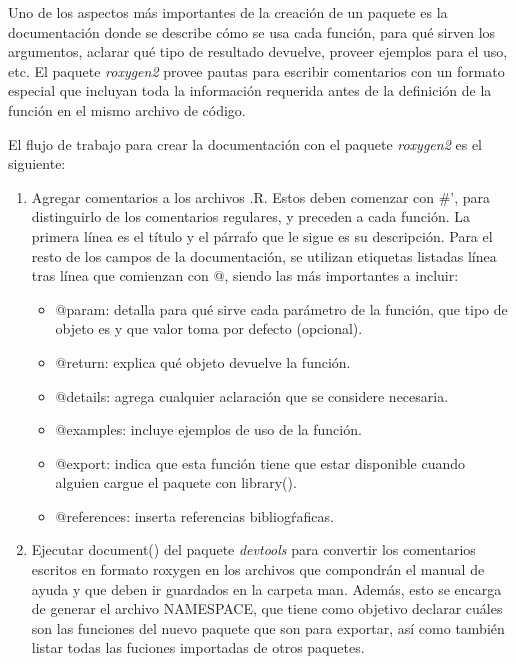 Uno de los aspectos más importantes de la creación de un paquete es la documentación donde se describe cómo se usa cada función, para qué sirven los argumentos, aclarar qué tipo de resultado devuelve, proveer ejemplos para el uso, etc. El paquete \emph{roxygen2} provee pautas para escribir comentarios con un formato especial que incluyan toda la información requerida antes de la definición de la función en el mismo archivo de código. 

El flujo de trabajo para crear la documentación con el paquete \emph{roxygen2} es el siguiente:

\begin{enumerate}

\item Agregar comentarios a los archivos .R. Estos deben comenzar con \#', para distinguirlo de los comentarios regulares, y preceden a cada función. La primera línea es el título y el párrafo que le sigue es su descripción. Para el resto de los campos de la documentación, se utilizan etiquetas listadas línea tras línea que comienzan con @, siendo las más importantes a incluir:

\begin{itemize}
\item @param: detalla para qué sirve cada parámetro de la función, que tipo de objeto es y que valor toma por defecto (opcional).
\item @return: explica qué objeto devuelve la función.
\item @details: agrega cualquier aclaración que se considere necesaria.
\item @examples: incluye ejemplos de uso de la función.
\item @export: indica que esta función tiene que estar disponible cuando alguien cargue el paquete con \textcolor{fandango}{library()}.
\item @references: inserta referencias bibliogŕaficas.
\end{itemize}

\item Ejecutar \textcolor{fandango}{document()} del paquete \emph{devtools} para convertir los comentarios escritos en formato roxygen en los archivos que compondrán el manual de ayuda y que deben ir guardados en la carpeta man. Además, esto se encarga de generar el archivo NAMESPACE, que tiene como objetivo declarar cuáles son las funciones del nuevo paquete que son para exportar, así como también listar todas las fuciones importadas de otros paquetes.

\end{enumerate}

